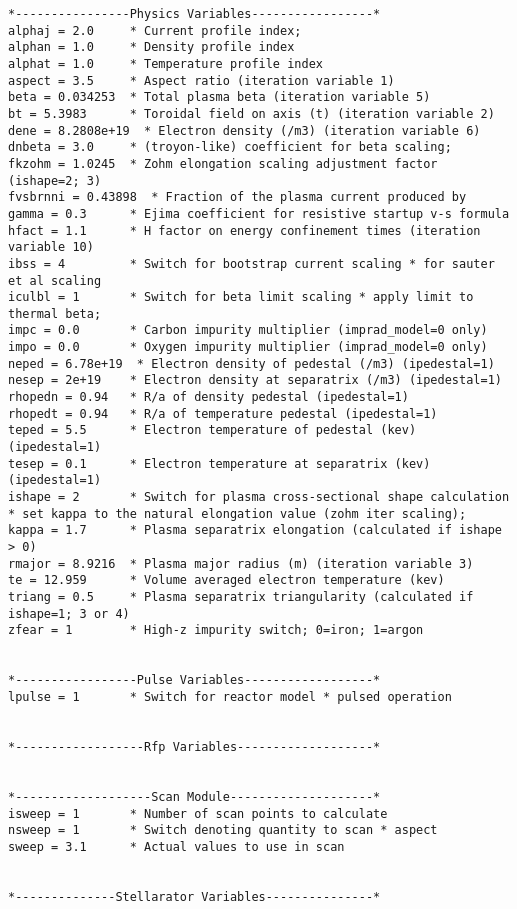 \documentclass[11pt,a4paper]{report}
\begin{document}
\begin{verbatim}
*----------------Physics Variables-----------------*
alphaj = 2.0     * Current profile index;
alphan = 1.0     * Density profile index
alphat = 1.0     * Temperature profile index
aspect = 3.5     * Aspect ratio (iteration variable 1)
beta = 0.034253  * Total plasma beta (iteration variable 5)
bt = 5.3983      * Toroidal field on axis (t) (iteration variable 2)
dene = 8.2808e+19  * Electron density (/m3) (iteration variable 6)
dnbeta = 3.0     * (troyon-like) coefficient for beta scaling;
fkzohm = 1.0245  * Zohm elongation scaling adjustment factor (ishape=2; 3)
fvsbrnni = 0.43898  * Fraction of the plasma current produced by
gamma = 0.3      * Ejima coefficient for resistive startup v-s formula
hfact = 1.1      * H factor on energy confinement times (iteration variable 10)
ibss = 4         * Switch for bootstrap current scaling * for sauter et al scaling
iculbl = 1       * Switch for beta limit scaling * apply limit to thermal beta;
impc = 0.0       * Carbon impurity multiplier (imprad_model=0 only)
impo = 0.0       * Oxygen impurity multiplier (imprad_model=0 only)
neped = 6.78e+19  * Electron density of pedestal (/m3) (ipedestal=1)
nesep = 2e+19    * Electron density at separatrix (/m3) (ipedestal=1)
rhopedn = 0.94   * R/a of density pedestal (ipedestal=1)
rhopedt = 0.94   * R/a of temperature pedestal (ipedestal=1)
teped = 5.5      * Electron temperature of pedestal (kev) (ipedestal=1)
tesep = 0.1      * Electron temperature at separatrix (kev) (ipedestal=1)
ishape = 2       * Switch for plasma cross-sectional shape calculation * set kappa to the natural elongation value (zohm iter scaling);
kappa = 1.7      * Plasma separatrix elongation (calculated if ishape > 0)
rmajor = 8.9216  * Plasma major radius (m) (iteration variable 3)
te = 12.959      * Volume averaged electron temperature (kev)
triang = 0.5     * Plasma separatrix triangularity (calculated if ishape=1; 3 or 4)
zfear = 1        * High-z impurity switch; 0=iron; 1=argon


*-----------------Pulse Variables------------------*
lpulse = 1       * Switch for reactor model * pulsed operation


*------------------Rfp Variables-------------------*


*-------------------Scan Module--------------------*
isweep = 1       * Number of scan points to calculate
nsweep = 1       * Switch denoting quantity to scan * aspect
sweep = 3.1      * Actual values to use in scan


*--------------Stellarator Variables---------------*



\end{verbatim}
\end{document}
